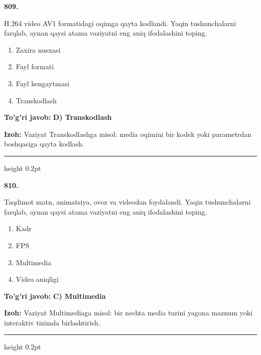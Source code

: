 \documentclass[10pt,a4paper,oneside]{article}
\begin{document}
\noindent\textbf{\color{ink}809.}
\par
H.264 video AV1 formatidagi oqimga qayta kodlandi. Yaqin tushunchalarni farqlab, aynan qaysi atama vaziyatni eng aniq ifodalashini toping.
\begin{enumerate}[label=\Alph*),leftmargin=9mm]
\item Zaxira nusxasi
\item Fayl formati
\item Fayl kengaytmasi
\item Transkodlash
\end{enumerate}
\begin{tcolorbox}[enhanced,breakable,colback=teal!4,colframe=teal!50!black,boxrule=0.5pt,arc=1.1mm,left=3mm,right=3mm,top=1.7mm,bottom=1.7mm,before skip=2mm,after skip=2mm]
\textbf{\color{teal}To'g'ri javob:} \textbf{D) Transkodlash}
\par\smallskip
\textbf{Izoh:} Vaziyat Transkodlashga misol: media oqimini bir kodek yoki parametrdan boshqasiga qayta kodlash.
\end{tcolorbox}
\vspace{2mm}\hrule height 0.2pt \vspace{3mm}

\noindent\textbf{\color{ink}810.}
\par
Taqdimot matn, animatsiya, ovoz va videodan foydalandi. Yaqin tushunchalarni farqlab, aynan qaysi atama vaziyatni eng aniq ifodalashini toping.
\begin{enumerate}[label=\Alph*),leftmargin=9mm]
\item Kadr
\item FPS
\item Multimedia
\item Video aniqligi
\end{enumerate}
\begin{tcolorbox}[enhanced,breakable,colback=teal!4,colframe=teal!50!black,boxrule=0.5pt,arc=1.1mm,left=3mm,right=3mm,top=1.7mm,bottom=1.7mm,before skip=2mm,after skip=2mm]
\textbf{\color{teal}To'g'ri javob:} \textbf{C) Multimedia}
\par\smallskip
\textbf{Izoh:} Vaziyat Multimediaga misol: bir nechta media turini yagona mazmun yoki interaktiv tizimda birlashtirish.
\end{tcolorbox}
\vspace{2mm}\hrule height 0.2pt \vspace{3mm}
\end{document}
